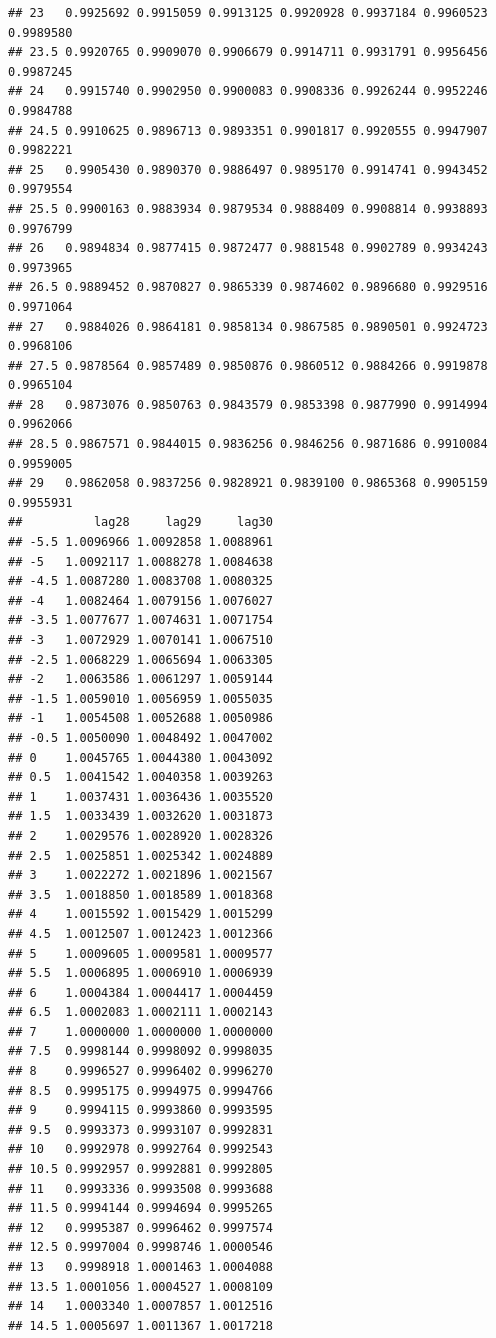 \documentclass[
]{book}
\begin{document}
\begin{verbatim}
## 23   0.9925692 0.9915059 0.9913125 0.9920928 0.9937184 0.9960523 0.9989580
## 23.5 0.9920765 0.9909070 0.9906679 0.9914711 0.9931791 0.9956456 0.9987245
## 24   0.9915740 0.9902950 0.9900083 0.9908336 0.9926244 0.9952246 0.9984788
## 24.5 0.9910625 0.9896713 0.9893351 0.9901817 0.9920555 0.9947907 0.9982221
## 25   0.9905430 0.9890370 0.9886497 0.9895170 0.9914741 0.9943452 0.9979554
## 25.5 0.9900163 0.9883934 0.9879534 0.9888409 0.9908814 0.9938893 0.9976799
## 26   0.9894834 0.9877415 0.9872477 0.9881548 0.9902789 0.9934243 0.9973965
## 26.5 0.9889452 0.9870827 0.9865339 0.9874602 0.9896680 0.9929516 0.9971064
## 27   0.9884026 0.9864181 0.9858134 0.9867585 0.9890501 0.9924723 0.9968106
## 27.5 0.9878564 0.9857489 0.9850876 0.9860512 0.9884266 0.9919878 0.9965104
## 28   0.9873076 0.9850763 0.9843579 0.9853398 0.9877990 0.9914994 0.9962066
## 28.5 0.9867571 0.9844015 0.9836256 0.9846256 0.9871686 0.9910084 0.9959005
## 29   0.9862058 0.9837256 0.9828921 0.9839100 0.9865368 0.9905159 0.9955931
##          lag28     lag29     lag30
## -5.5 1.0096966 1.0092858 1.0088961
## -5   1.0092117 1.0088278 1.0084638
## -4.5 1.0087280 1.0083708 1.0080325
## -4   1.0082464 1.0079156 1.0076027
## -3.5 1.0077677 1.0074631 1.0071754
## -3   1.0072929 1.0070141 1.0067510
## -2.5 1.0068229 1.0065694 1.0063305
## -2   1.0063586 1.0061297 1.0059144
## -1.5 1.0059010 1.0056959 1.0055035
## -1   1.0054508 1.0052688 1.0050986
## -0.5 1.0050090 1.0048492 1.0047002
## 0    1.0045765 1.0044380 1.0043092
## 0.5  1.0041542 1.0040358 1.0039263
## 1    1.0037431 1.0036436 1.0035520
## 1.5  1.0033439 1.0032620 1.0031873
## 2    1.0029576 1.0028920 1.0028326
## 2.5  1.0025851 1.0025342 1.0024889
## 3    1.0022272 1.0021896 1.0021567
## 3.5  1.0018850 1.0018589 1.0018368
## 4    1.0015592 1.0015429 1.0015299
## 4.5  1.0012507 1.0012423 1.0012366
## 5    1.0009605 1.0009581 1.0009577
## 5.5  1.0006895 1.0006910 1.0006939
## 6    1.0004384 1.0004417 1.0004459
## 6.5  1.0002083 1.0002111 1.0002143
## 7    1.0000000 1.0000000 1.0000000
## 7.5  0.9998144 0.9998092 0.9998035
## 8    0.9996527 0.9996402 0.9996270
## 8.5  0.9995175 0.9994975 0.9994766
## 9    0.9994115 0.9993860 0.9993595
## 9.5  0.9993373 0.9993107 0.9992831
## 10   0.9992978 0.9992764 0.9992543
## 10.5 0.9992957 0.9992881 0.9992805
## 11   0.9993336 0.9993508 0.9993688
## 11.5 0.9994144 0.9994694 0.9995265
## 12   0.9995387 0.9996462 0.9997574
## 12.5 0.9997004 0.9998746 1.0000546
## 13   0.9998918 1.0001463 1.0004088
## 13.5 1.0001056 1.0004527 1.0008109
## 14   1.0003340 1.0007857 1.0012516
## 14.5 1.0005697 1.0011367 1.0017218

\end{verbatim}
\end{document}
